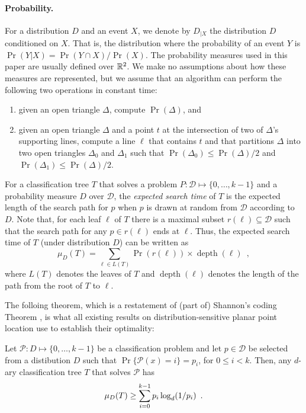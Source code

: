 \documentclass[charterfonts,lotsofwhite]{patmorin}
\DeclareMathOperator{\depth}{depth}
\begin{document}
\paragraph{Probability.}

For a distribution $D$ and an event $X$, we denote by $D_{|X}$ the
distribution $D$ conditioned on $X$.  That is, the distribution where
the probability of an event $Y$ is $\Pr(Y|X)=\Pr(Y\cap X)/\Pr(X)$.
The probability measures used in this paper are usually defined over
$\mathbb{R}^2$.  We make no assumptions about how these measures are
represented, but we assume that an algorithm can perform the following
two operations in constant time:
\begin{enumerate}
\item given an open triangle $\Delta$, compute $\Pr(\Delta)$, and
\item given an open triangle $\Delta$ and a point $t$ at the
intersection of two of $\Delta$'s supporting lines, compute a line $\ell$
that contains $t$ and that partitions $\Delta$ into two open triangles
$\Delta_0$ and $\Delta_1$ such that $\Pr(\Delta_0)\le\Pr(\Delta)/2$
and $\Pr(\Delta_1)\le\Pr(\Delta)/2$.
\end{enumerate}

For a classification tree $T$ that solves a problem
$P:\mathcal{D}\mapsto\{0,\ldots,k-1\}$ and a probability measure $D$
over $\mathcal{D}$, the \emph{expected search time} of $T$ is the
expected length of the search path for $p$ when $p$ is drawn at random
from $\mathcal{D}$ according to $D$.  Note that, for each leaf $\ell$
of $T$ there is a maximal subset $r(\ell)\subseteq \mathcal{D}$ such
that the search path for any $p\in r(\ell)$ ends at $\ell$.  Thus, the
expected search time of $T$ (under distribution $D$) can be written as
\[
     \mu_D(T) = \sum_{\ell\in L(T)} \Pr(r(\ell))\times \depth(\ell)
	\enspace ,
\]
where $L(T)$ denotes the leaves of $T$ and $\depth(\ell)$ denotes the
length of the path from the root of $T$ to $\ell$.

The folloing theorem, which is a restatement of (part of) Shannon's
coding Theorem \cite{s48}, is what all existing results on
distribution-sensitive planar point location use to establish their
optimality:

\begin{thm}
Let $\mathcal{P}:D\mapsto \{0,\ldots,k-1\}$ be a classification
problem and let $p\in \mathcal{D}$ be selected from a distibution $D$ such
that $\Pr\{\mathcal{P}(x)= i\}=p_i$, for $0\le i< k$.  Then, any
$d$-ary classification tree $T$ that solves $\mathcal{P}$ has
\begin{equation}
     \mu_D(T) \ge \sum_{i=0}^{k-1} p_i\log_d(1/p_i) \enspace .
	\eqlabel{shannon}
\end{equation}
\end{thm}
\end{document}
